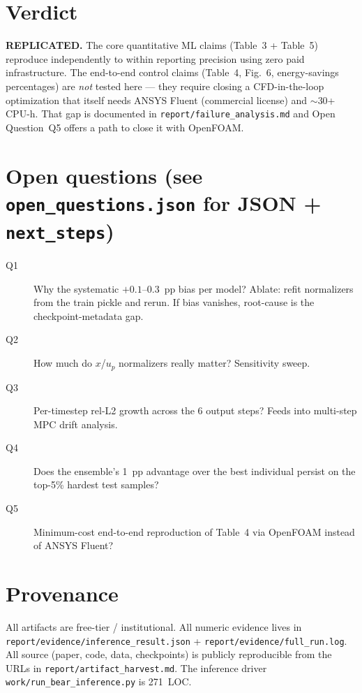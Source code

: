 \documentclass[10pt]{article}
\begin{document}
\section{Verdict}
\textbf{REPLICATED.} The core quantitative ML claims (Table~3 + Table~5)
reproduce independently to within reporting precision using zero paid
infrastructure. The end-to-end control claims (Table~4, Fig.~6, energy-savings
percentages) are \emph{not} tested here — they require closing a
CFD-in-the-loop optimization that itself needs ANSYS Fluent (commercial
license) and $\sim$30+ CPU-h. That gap is documented in
\texttt{report/failure\_analysis.md} and Open Question~Q5 offers a path to
close it with OpenFOAM.

\section{Open questions (see \texttt{open\_questions.json} for JSON + \texttt{next\_steps})}
\begin{description}
\item[Q1] Why the systematic $+0.1$--$0.3$~pp bias per model? Ablate: refit normalizers from the train pickle and rerun. If bias vanishes, root-cause is the checkpoint-metadata gap.
\item[Q2] How much do $x$/$u_p$ normalizers really matter? Sensitivity sweep.
\item[Q3] Per-timestep rel-L2 growth across the 6 output steps? Feeds into multi-step MPC drift analysis.
\item[Q4] Does the ensemble's 1~pp advantage over the best individual persist on the top-5\% hardest test samples?
\item[Q5] Minimum-cost end-to-end reproduction of Table~4 via OpenFOAM instead of ANSYS Fluent?
\end{description}

\section*{Provenance}
All artifacts are free-tier / institutional. All numeric evidence lives in
\texttt{report/evidence/inference\_result.json} +
\texttt{report/evidence/full\_run.log}. All source (paper, code, data,
checkpoints) is publicly reproducible from the URLs in
\texttt{report/artifact\_harvest.md}. The inference driver
\texttt{work/run\_bear\_inference.py} is 271~LOC.
\end{document}
